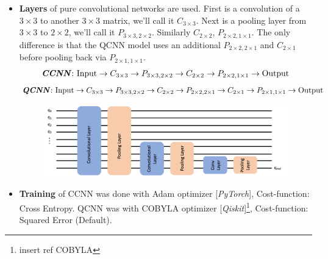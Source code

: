 \documentclass[a4paper]{article}
\begin{document}
\begin{itemize}
\item \textbf{Layers} of pure convolutional networks are used. First is a convolution of a $3\times3$ to another $3\times3$ matrix, we'll call it $C_{3\times3}$. Next is a pooling layer from $3\times3$ to $2\times2$, we'll call it $P_{3\times3,2\times2}$. Similarly $C_{2\times2}$, $P_{2\times2,1\times1}$. The only difference is that the QCNN model uses an additional $P_{2\times2,2\times1}$ and $C_{2\times1}$ before pooling back via $P_{2\times1,1\times1}$.
\[\text{\emph{\textbf{CCNN}}: Input} \rightarrow C_{3\times3} \rightarrow P_{3\times3,2\times2} \rightarrow C_{2\times2} \rightarrow P_{2\times2,1\times1} \rightarrow \text{Output}\]
\[\text{\emph{\textbf{QCNN}}: Input} \rightarrow C_{3\times3} \rightarrow P_{3\times3,2\times2} \rightarrow C_{2\times2} \rightarrow P_{2\times2,2\times1} \rightarrow C_{2\times1} \rightarrow P_{2\times1,1\times1} \rightarrow \text{Output}\]

\begin{figure}[h]
\centering
\includegraphics[height = 0.3\textwidth]{assets/QCNN.png}
\label{fig:test}
\end{figure}

\item \textbf{Training} of CCNN was done with Adam optimizer [\emph{PyTorch}], Cost-function: Cross Entropy. QCNN was with COBYLA optimizer [\emph{Qiskit}]\footnote{insert ref COBYLA}, Cost-function: Squared Error (Default).


\end{itemize}
\end{document}
